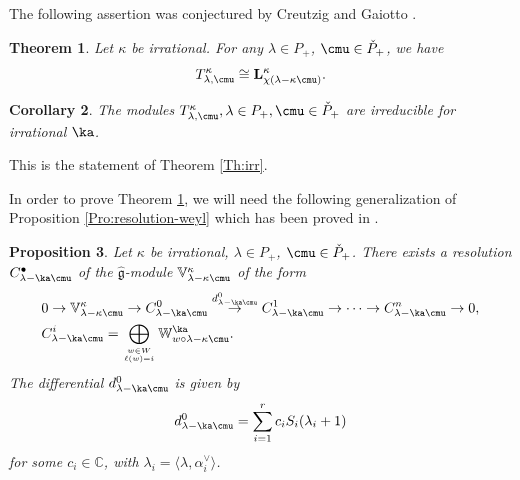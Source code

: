 \documentclass{amsart}
\newcommand{\Wak}[2]{\mathbb{W}_{#1}^{#2}}
\newcommand{\bra}{{\langle}}
\newcommand{\ket}{{\rangle}}
\newcommand{\+}{\mathop{\oplus}}
\renewcommand{\*}{{\otimes}}
\newcommand{\mf}{\mathfrak}
\newcommand{\affg}{\widehat{\mf{g}}}
\newcommand{\C}{\mathbb{C}}
\newcommand{\ra}{\rightarrow}
\newcommand{\lam}{\lambda}
\theoremstyle{theorem}
\newtheorem{Th}{Theorem}[section]
\newtheorem{Pro}[Th]{Proposition}
\newtheorem{Co}[Th]{Corollary}
\theoremstyle{remark}
\numberwithin{equation}{section}
\begin{document}
The following assertion was conjectured by Creutzig and Gaiotto
\cite{CreGai}.

\begin{Th}\label{Th:CG}
Let $\kappa$ be irrational.
For any $\lam\in P_+$, $\cmu\in \check{P}_+$,
we have
$$T^{\kappa}_{\lam,\cmu}\cong \mathbf{L}_{\chi(\lam-\kappa\cmu)}^\kappa.$$
\end{Th}

\begin{Co}
The modules $T^{\kappa}_{\lam,\cmu}, \lam \in P_+, \cmu \in
\check{P}_+$ are irreducible for irrational $\ka$.
\end{Co}

This is the statement of Theorem \ref{Th:irr}.

In order to prove Theorem \ref{Th:CG}, we will need the following
generalization of Proposition \ref{Pro:resolution-weyl} which
has been proved in \cite{ACL17}.

\begin{Pro}\label{Pro:resolution-for-generic-level-more-general}
Let $\kappa$ be irrational,
$\lam\in P_+$, $\cmu \in \check{P}_+$.
There exists a resolution $C^\bullet_{\lam-\ka\cmu}$
of the $\affg$-module $\mathbb{V}_{\lam-\kappa\cmu}^\kappa$ of the form
\begin{align*}
&0\ra \mathbb{V}_{\lam-\kappa\cmu}^\kappa \ra
C^0_{\lam-\ka\cmu}\overset{d^0_{\lam-\ka\cmu}}{\ra}
C^1_{\lam-\ka\cmu}\ra\dots \ra C^n_{\lam-\ka\cmu}\ra 0,\\
& C^i_{\lam-\ka\cmu} =
\bigoplus_{w\in W\atop \ell(w)=i}\Wak{w\circ \lam-\kappa\cmu}{\ka}.
\end{align*}
The differential $d^0_{\lam-\ka\cmu}$ is given by
$$d^0_{\lam-\ka\cmu}=\sum_{i=1}^{r}
c_i S_i(\lam_i+1)$$
for some $c_i\in \C$, with $\lam_i=\bra \lam,\alpha_i^\vee\ket$.
\end{Pro}
\end{document}
